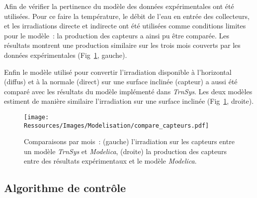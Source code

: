 Afin de vérifier la pertinence du modèle des données expérimentales ont été utilisées.
Pour ce faire la température, le débit de l’eau en entrée des collecteurs, et les
irradiations directe et indirecte ont été utilisées comme conditions limites pour le
modèle~: la production des capteurs a ainsi pu être comparée. Les résultats montrent une
production similaire sur les trois mois couverts par les données expérimentales
(Fig~\ref{fig:compare_capteurs}, gauche).

Enfin le modèle utilisé pour convertir l’irradiation disponible à l’horizontal (diffus) et
à la normale (direct) sur une surface inclinée (capteur) a aussi été comparé avec les
résultats du modèle implémenté dans \emph{TrnSys}. Les deux modèles estiment de manière
similaire l’irradiation sur une surface inclinée (Fig~\ref{fig:compare_capteurs}, droite).

\begin{figure}
    \begin{center}
        \texttt{[image: Ressources/Images/Modelisation/compare\_capteurs.pdf]}
    \end{center}
    \caption{Comparaisons par mois~: (gauche) l’irradiation sur les capteurs entre un modèle
             \emph{TrnSys} et \emph{Modelica}, (droite) la production des capteurs entre des résultats
             expérimentaux et le modèle \emph{Modelica}.
             \label{fig:compare_capteurs}}
\end{figure}


\subsection{Algorithme de contrôle} %
\label{sub:algorithme_de_controle}
